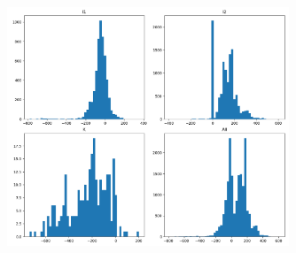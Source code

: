\documentclass[11pt]{article}
\begin{document}
  \begin{figure}[H]
      \centering
      \includegraphics[width=0.75\textwidth]{../../../output/figures/Description/cd_histograms.png}
  \end{figure}
\end{document}
